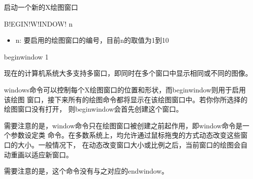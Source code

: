 \label{cmd:beginwindow}

启动一个新的X绘图窗口

\begin{SACSTX}
B!EGIN!W!INDOW! n
\end{SACSTX}

\begin{itemize}
\item n: 要启用的绘图窗口的编号，目前n的取值为1到10
\end{itemize}

\begin{SACDFT}
beginwindow 1
\end{SACDFT}

现在的计算机系统大多支持多窗口，即同时在多个窗口中显示相同或不同的图像。

windows命令可以控制每个X绘图窗口的位置和形状，而beginwindow则用于启用该绘图
窗口，接下来所有的绘图命令都将显示在该绘图窗口中。若你你所选择的绘图窗口没有打开，
则beginwindow会首先创建这个窗口。

需要注意的是，window命令只在绘图窗口被创建之前起作用，即window命令是一个参数设定类
命令。在多数系统上，均允许通过鼠标拖曳的方式动态改变这些窗口的大小。一般情况下，
在动态改变窗口大小或比例之后，当前窗口的绘图会自动重画以适应新窗口。

需要注意的是，这个命令没有与之对应的endwindow。

